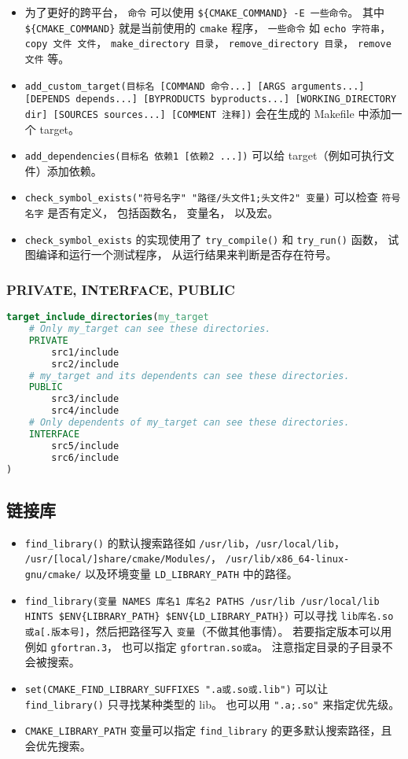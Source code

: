 \begin{itemize}
\item 为了更好的跨平台， \verb`命令` 可以使用 \verb`${CMAKE_COMMAND} -E 一些命令`。 其中 \verb`${CMAKE_COMMAND}` 就是当前使用的 \verb`cmake` 程序， \verb`一些命令` 如 \verb`echo 字符串`，\verb`copy 文件 文件`， \verb`make_directory 目录`， \verb`remove_directory 目录`， \verb`remove 文件` 等。
\item \verb`add_custom_target(目标名 [COMMAND 命令...] [ARGS arguments...] [DEPENDS depends...] [BYPRODUCTS byproducts...] [WORKING_DIRECTORY dir] [SOURCES sources...] [COMMENT 注释])` 会在生成的 Makefile 中添加一个 target。
\item \verb`add_dependencies(目标名 依赖1 [依赖2 ...])` 可以给 target（例如可执行文件）添加依赖。
\item \verb`check_symbol_exists("符号名字" "路径/头文件1;头文件2" 变量)` 可以检查 \verb`符号名字` 是否有定义， 包括函数名， 变量名， 以及宏。
\item \verb`check_symbol_exists` 的实现使用了 \verb`try_compile()` 和 \verb`try_run()` 函数， 试图编译和运行一个测试程序， 从运行结果来判断是否存在符号。
\end{itemize}

\subsubsection{PRIVATE, INTERFACE, PUBLIC}
\begin{lstlisting}[language=cmake]
target_include_directories(my_target
    # Only my_target can see these directories.
    PRIVATE
        src1/include
        src2/include
    # my_target and its dependents can see these directories.
    PUBLIC
        src3/include
        src4/include
    # Only dependents of my_target can see these directories.
    INTERFACE
        src5/include
        src6/include
)
\end{lstlisting}

\subsection{链接库}
\begin{itemize}
\item \verb`find_library()` 的默认搜索路径如 \verb`/usr/lib`，\verb`/usr/local/lib`， \verb`/usr/[local/]share/cmake/Modules/`， \verb`/usr/lib/x86_64-linux-gnu/cmake/` 以及环境变量 \verb`LD_LIBRARY_PATH` 中的路径。
\item \verb`find_library(变量 NAMES 库名1 库名2 PATHS /usr/lib /usr/local/lib HINTS $ENV{LIBRARY_PATH} $ENV{LD_LIBRARY_PATH})` 可以寻找 \verb`lib库名.so或a[.版本号]`，然后把路径写入 \verb`变量`（不做其他事情）。 若要指定版本可以用例如 \verb`gfortran.3`， 也可以指定 \verb`gfortran.so或a`。 注意指定目录的子目录不会被搜索。
\item \verb`set(CMAKE_FIND_LIBRARY_SUFFIXES ".a或.so或.lib")` 可以让 \verb`find_library()` 只寻找某种类型的 lib。 也可以用 \verb`".a;.so"` 来指定优先级。
\item \verb`CMAKE_LIBRARY_PATH` 变量可以指定 \verb`find_library` 的更多默认搜索路径，且会优先搜索。
\end{itemize}

